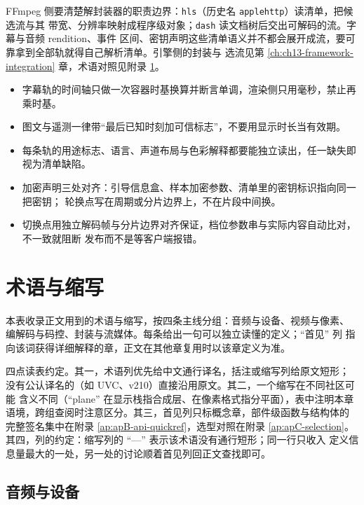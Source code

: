 \documentclass[12pt,a4paper,fontset=fandol]{ctexbook}
\newcommand{\Tp}[1]{\texttt{#1}}
\begin{document}
FFmpeg 侧要清楚解封装器的职责边界：\Tp{hls}（历史名 \Tp{applehttp}）读清单，把候选流与其
带宽、分辨率映射成程序级对象；\Tp{dash} 读文档树后交出可解码的流。字幕与音频 rendition、事件
区间、密钥声明这些清单语义并不都会展开成流，要可靠拿到全部轨就得自己解析清单。引擎侧的封装与
选流见第 \ref{ch:ch13-framework-integration} 章，术语对照见附录 \ref{ap:apA-glossary}。

\begin{bestpractice}[title={投递层落地的五条检查}]
\begin{itemize}
\item 字幕轨的时间轴只做一次容器时基换算并断言单调，渲染侧只用毫秒，禁止再乘时基。
\item 图文与遥测一律带``最后已知时刻加可信标志''，不要用显示时长当有效期。
\item 每条轨的用途标志、语言、声道布局与色彩解释都要能独立读出，任一缺失即视为清单缺陷。
\item 加密声明三处对齐：引导信息盒、样本加密参数、清单里的密钥标识指向同一把密钥；
      轮换点写在周期或分片边界上，不在片段中间换。
\item 切换点用独立解码帧与分片边界对齐保证，档位参数串与实际内容自动比对，不一致就阻断
      发布而不是等客户端报错。
\end{itemize}
\end{bestpractice}

\appendix
\chapter{术语与缩写}
\label{ap:apA-glossary}

本表收录正文用到的术语与缩写，按四条主线分组：音频与设备、视频与像素、
编解码与码控、封装与流媒体。每条给出一句可以独立读懂的定义；``首见'' 列
指向该词获得详细解释的章，正文在其他章复用时以该章定义为准。

四点读表约定。其一，术语列优先给中文通行译名，括注或缩写列给原文短形；
没有公认译名的（如 UVC、v210）直接沿用原文。其二，一个缩写在不同社区可能
含义不同（``plane'' 在显示栈指合成层、在像素格式指分平面），表中注明本章
语境，跨组查阅时注意区分。其三，首见列只标概念章，部件级函数与结构体的
完整签名集中在附录 \ref{ap:apB-api-quickref}，选型对照在附录
\ref{ap:apC-selection}。
其四，列的约定：缩写列的 ``—'' 表示该术语没有通行短形；同一行只收入
定义信息量最大的一处，另一处的讨论顺着首见列回正文查找即可。

\section{音频与设备}
\end{document}
